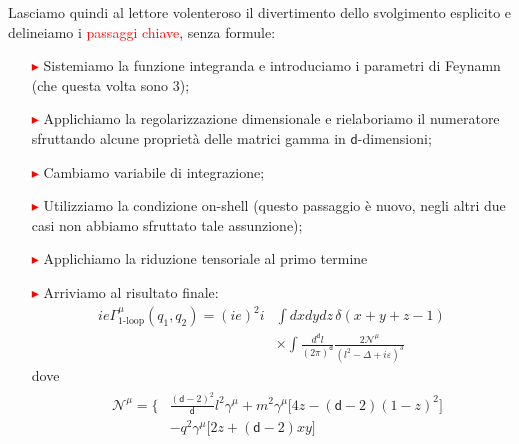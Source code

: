 \documentclass[../main.tex]{subfiles}
\begin{document}
\begin{itemize}
    Lasciamo quindi al lettore volenteroso il divertimento dello svolgimento esplicito e delineiamo i \textcolor{Red}{passaggi chiave}, senza formule:
    \begin{itemize}
        \item[\textcolor{Red}{$\blacktriangleright$}] Sistemiamo la funzione integranda e introduciamo i parametri di Feynamn (che questa volta sono 3);
        \item[\textcolor{Red}{$\blacktriangleright$}] Applichiamo la regolarizzazione dimensionale e rielaboriamo il numeratore sfruttando alcune proprietà delle matrici gamma in $\mathsf d$-dimensioni;
        \item[\textcolor{Red}{$\blacktriangleright$}] Cambiamo variabile di integrazione;
        \item[\textcolor{Red}{$\blacktriangleright$}] Utilizziamo la condizione on-shell (questo passaggio è nuovo, negli altri due casi non abbiamo sfruttato tale assunzione);
        \item[\textcolor{Red}{$\blacktriangleright$}] Applichiamo la riduzione tensoriale al primo termine
        \item[\textcolor{Red}{$\blacktriangleright$}] Arriviamo al risultato finale:
            \begin{equation}
               \boxed{ 
               \begin{aligned}
                   ie\Gamma^\mu_\text{1-loop}(q_1,q_2) = (ie)^2i&\int dxdydz \,\delta(x+y+z-1) \\ 
                   &\times\int \frac{d^\mathsf d l}{(2\pi)^\mathsf d } \frac{2\mathscr{N}^\mu}{(l^2-\Delta+i\varepsilon)^3}
               \end{aligned}}
                \label{eq:vertex_amplit_oneloop_final1}
            \end{equation}
            dove
            \begin{equation}
            \begin{aligned}
                &\begin{aligned}
                       \mathscr{N}^\mu =\Bigg\{ & \frac{(\mathsf d-2)^2}{\mathsf d}l^2\gamma^\mu +m^2\gamma^\mu\bigl[ 4z - (\mathsf d - 2)(1-z)^2 \bigr]\\
                       & - q^2\gamma^\mu\bigl[ 2z + (\mathsf d - 2)xy \bigr] \\

\end{aligned}
\end{aligned}
\end{equation}
\end{itemize}
\end{itemize}
\end{document}
